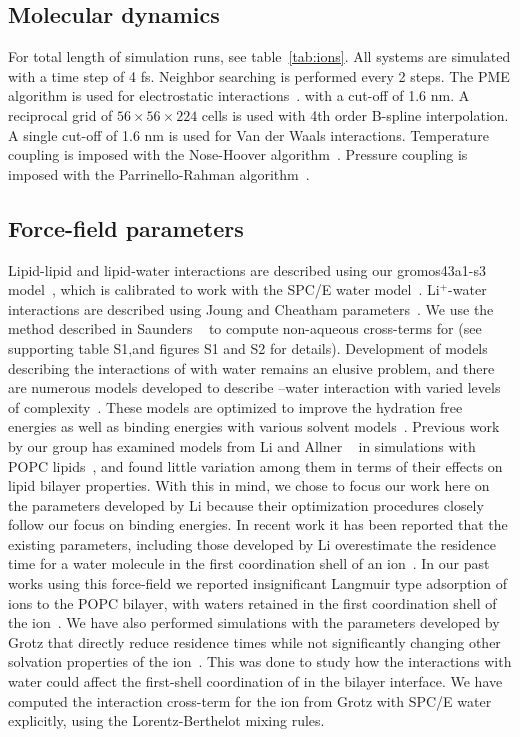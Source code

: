 \subsection{Molecular dynamics}
For total length of simulation runs, see table~\ref{tab:ions}.
All systems are simulated with a time step of 4 fs.
Neighbor searching is performed every 2 steps.
The PME algorithm is used for electrostatic interactions~\cite{essmann:1995}.
with a cut-off of 1.6 nm.
A reciprocal grid of $56 \times 56 \times 224$ cells is used with 4th order B-spline interpolation.
A single cut-off of 1.6 nm is used for Van der Waals interactions.
Temperature coupling is imposed with the Nose-Hoover algorithm~\cite{nose:1983}.
Pressure coupling is imposed with the Parrinello-Rahman algorithm~\cite{parrinello:1981}.

\subsection{Force-field parameters}

Lipid-lipid and lipid-water interactions are described using our 
gromos43a1-s3 model~\cite{chiu:2009}, 
which is calibrated to work with the SPC/E water model~\cite{spce}. 
Li$^+$-water interactions 
are described using Joung and Cheatham parameters~\cite{joung:2008}. 
We use the method described in Saunders ~\cite{saunders:2022} to compute non-aqueous
cross-terms for \li (see supporting table S1,and figures S1 and S2 for details). 
Development of models describing the interactions of \mg with water remains an elusive
problem, and there are numerous
models developed to describe \mg--water interaction with varied levels of complexity~\cite{merzparams,villaparams,microparams,julian:2023:mg}.
These models are optimized to improve the hydration free energies as well as
binding energies with various solvent models~\cite{merzparams,villaparams,microparams}.  
Previous work by our group has examined \mg models
from Li \etal and Allner \etal~\cite{merzparams,villaparams} in simulations with POPC lipids~\cite{kruczek:2019}, 
and found little variation among them in terms of their effects on lipid bilayer properties. 
With this in mind, we chose to focus our work here on the parameters developed by Li \etal because
their optimization procedures closely follow our focus on binding energies.
In recent work it has been reported that the existing \mg parameters, 
including those developed by Li \etal
overestimate the residence time for a water molecule in the 
first coordination shell of an ion~\cite{microparams}. 
In our past works using this force-field we reported 
insignificant Langmuir type adsorption of \mg ions to the POPC bilayer,
with waters retained in the first coordination shell of the ion~\cite{kruczek:2019}. 
We have also performed simulations with the parameters developed by Grotz \etal that directly
reduce residence times while not significantly changing other solvation 
properties of the ion~\cite{grotz:2021:optimized,microparams}. 
This was done to study how the interactions with water
could affect the first-shell coordination of \mg in the bilayer interface. 
We have {computed} 
the interaction cross-term for the \mg ion from Grotz \etal
with SPC/E water explicitly, using {the Lorentz-Berthelot mixing rules.}
